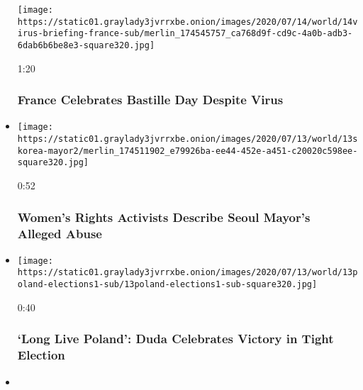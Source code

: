 \begin{itemize}
  \texttt{[image: https://static01.graylady3jvrrxbe.onion/images/2020/07/14/world/14virus-briefing-france-sub/merlin\_174545757\_ca768d9f-cd9c-4a0b-adb3-6dab6b6be8e3-square320.jpg]}

  1:20

  \hypertarget{france-celebrates-bastille-day-despite-virus}{%
  \subsubsection{France Celebrates Bastille Day Despite
  Virus}\label{france-celebrates-bastille-day-despite-virus}}
\item
  \href{https://www.nytimes3xbfgragh.onion/video/us/100000007236404/seoul-mayor-abuse-sexual-harassment.html?action=click\&module=video-series-bar\&region=header\&pgtype=Article\&playlistId=video/world}{}

  \texttt{[image: https://static01.graylady3jvrrxbe.onion/images/2020/07/13/world/13skorea-mayor2/merlin\_174511902\_e79926ba-ee44-452e-a451-c20020c598ee-square320.jpg]}

  0:52

  \hypertarget{womens-rights-activists-describe-seoul-mayors-alleged-abuse}{%
  \subsubsection{Women's Rights Activists Describe Seoul Mayor's Alleged
  Abuse}\label{womens-rights-activists-describe-seoul-mayors-alleged-abuse}}
\item
  \href{https://www.nytimes3xbfgragh.onion/video/world/europe/100000007236353/poland-election-duda-victory-speech.html?action=click\&module=video-series-bar\&region=header\&pgtype=Article\&playlistId=video/world}{}

  \texttt{[image: https://static01.graylady3jvrrxbe.onion/images/2020/07/13/world/13poland-elections1-sub/13poland-elections1-sub-square320.jpg]}

  0:40

  \hypertarget{long-live-poland-duda-celebrates-victory-in-tight-election}{%
  \subsubsection{`Long Live Poland': Duda Celebrates Victory in Tight
  Election}\label{long-live-poland-duda-celebrates-victory-in-tight-election}}
\item
  \href{https://www.nytimes3xbfgragh.onion/video/us/100000007233462/seoul-officials-read-mayor-note.html?action=click\&module=video-series-bar\&region=header\&pgtype=Article\&playlistId=video/world}{}


\end{itemize}
